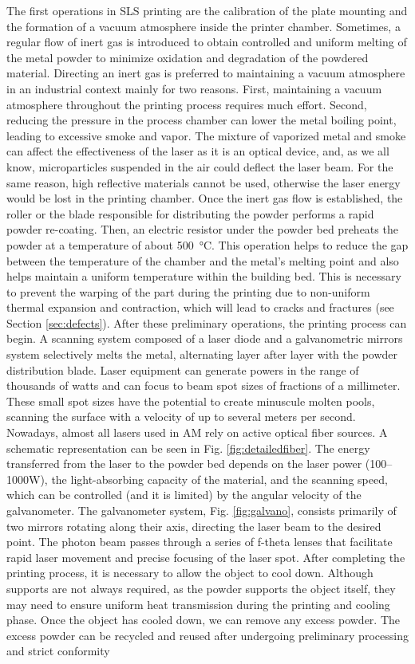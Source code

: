 The first operations in SLS printing are the calibration of the plate mounting and the formation of a vacuum atmosphere inside the printer chamber. Sometimes, a regular flow of inert gas is introduced to obtain controlled and uniform melting of the metal powder to minimize oxidation and degradation of the powdered material. Directing an inert gas is preferred to maintaining a vacuum atmosphere in an industrial context mainly for two reasons. First, maintaining a vacuum atmosphere throughout the printing process requires much effort. Second, reducing the pressure in the process chamber can lower the metal boiling point, leading to excessive smoke and vapor. The mixture of vaporized metal and smoke can affect the effectiveness of the laser as it is an optical device, and, as we all know, microparticles suspended in the air could deflect the laser beam. For the same reason, high reflective materials cannot be used, otherwise the laser energy would be lost in the printing chamber. Once the inert gas flow is established, the roller or the blade responsible for distributing the powder performs a rapid powder re-coating. Then, an electric resistor under the powder bed preheats the powder at a temperature of about \SI{500}{\degreeCelsius}. This operation helps to reduce the gap between the temperature of the chamber and the metal's melting point and also helps maintain a uniform temperature within the building bed. This is necessary to prevent the warping of the part during the printing due to non-uniform thermal expansion and contraction, which will lead to cracks and fractures (see Section \ref{sec:defects}). After these preliminary operations, the printing process can begin. A scanning system composed of a laser diode and a galvanometric mirrors system selectively melts the metal, alternating layer after layer with the powder distribution blade.  Laser equipment can generate powers in the range of thousands of watts and can focus to beam spot sizes of fractions of a millimeter. These small spot sizes have the potential to create minuscule molten pools, scanning the surface with a velocity of up to several meters per second. Nowadays, almost all lasers used in AM rely on active optical fiber sources. A schematic representation can be seen in Fig. \ref{fig:detailedfiber}. The energy transferred from the laser to the powder bed depends on the laser power (\numrange[range-phrase = --]{100}{1000}\unit{\watt}), the light-absorbing capacity of the material, and the scanning speed, which can be controlled (and it is limited) by the angular velocity of the galvanometer. The galvanometer system, Fig. \ref{fig:galvano}, consists primarily of two mirrors rotating along their axis, directing the laser beam to the desired point. The photon beam passes through a series of f-theta lenses that facilitate rapid laser movement and precise focusing of the laser spot. After completing the printing process, it is necessary to allow the object to cool down. Although supports are not always required, as the powder supports the object itself, they may need to ensure uniform heat transmission during the printing and cooling phase. Once the object has cooled down, we can remove any excess powder. The excess powder can be recycled and reused after undergoing preliminary processing and strict conformity 